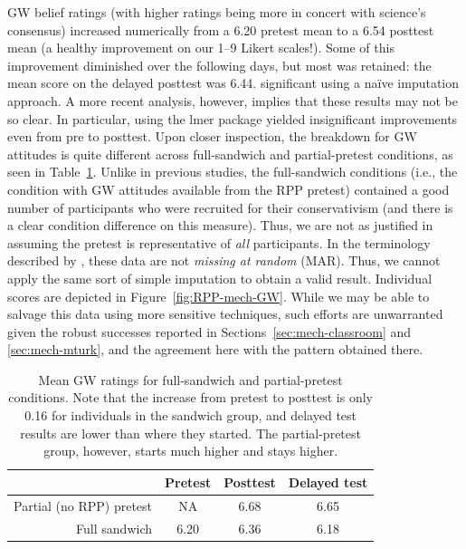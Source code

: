 GW belief ratings (with higher ratings being more in concert with science’s
consensus) increased numerically from a 6.20 pretest mean to a 6.54 posttest
mean
(a healthy improvement on our 1--9 Likert scales!). Some of this improvement
diminished over the following days, but most was retained: the mean score on the
delayed posttest was 6.44.  %
significant using a naïve imputation approach. A more recent analysis, however,
implies that these results may not be so clear.  In particular, using the
\textsf{lmer} package yielded insignificant improvements even from pre to
posttest. Upon closer inspection, the breakdown for GW attitudes is quite
different across full-sandwich and partial-pretest conditions, as seen in
Table~\ref{table:RPP-mech-gw-breakdown}. Unlike in previous studies, the
full-sandwich conditions (i.e., the condition with GW attitudes available from the
RPP pretest) contained a good number of participants who were recruited for
their conservativism (and there is a clear condition difference on this measure).
Thus, we are not as justified in assuming the pretest is representative of
\emph{all} participants. In the terminology described by
\textcite{fox_applied_2008}, these data are not \emph{missing at random} (MAR).
Thus, we cannot apply the same sort of simple imputation to obtain a valid
result.  Individual scores are depicted in Figure~\ref{fig:RPP-mech-GW}. While
we may be able to salvage this data using more sensitive techniques, such
efforts are unwarranted given the robust successes reported in
Sections~\ref{sec:mech-classroom} and \ref{sec:mech-mturk}, and the agreement
here with the pattern obtained there.



\begin{table}[ht]
\centering
\caption{Mean GW ratings for full-sandwich and partial-pretest conditions. Note that the
    increase from pretest to posttest is only 0.16 for individuals in the
    sandwich group, and delayed test results are lower than where they started.
    The partial-pretest group, however, starts much higher and stays higher.}
\label{table:RPP-mech-gw-breakdown}
\begin{tabular}{rccc}
  \toprule
        & Pretest & Posttest & Delayed test \\ 
  \midrule
  Partial (no RPP) pretest & NA & 6.68 & 6.65 \\ 
  Full sandwich & 6.20 & 6.36 & 6.18 \\ 
   \bottomrule
\end{tabular}
\end{table}

